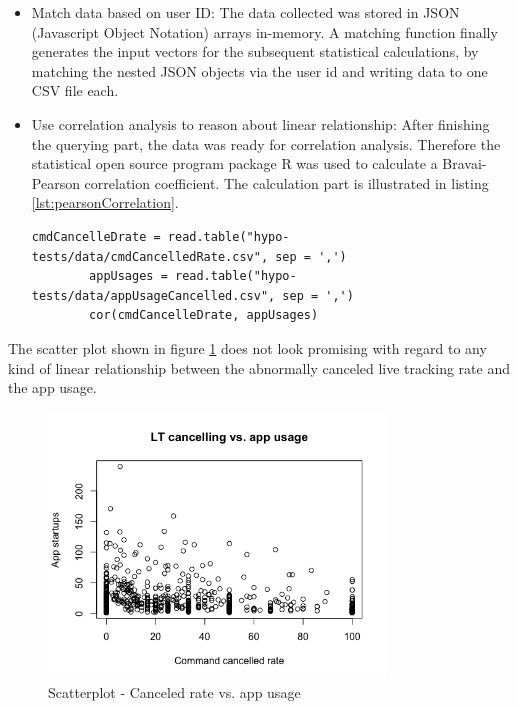 \begin{enumerate}
\begin{itemize}
		\item Match data based on user ID: The data collected was stored in JSON (Javascript Object Notation) arrays in-memory. A matching function finally generates the input vectors for the subsequent statistical calculations, by matching the nested JSON objects via the user id and writing data to one CSV file each. 
		\item Use correlation analysis to reason about linear relationship: After finishing the querying part, the data was ready for correlation analysis. Therefore the statistical open source program package R was used to calculate a Bravai-Pearson correlation coefficient. The calculation part is illustrated in listing \ref{lst:pearsonCorrelation}. 
		
		\begin{lstlisting}[caption={Calculation of pearson correlation and statistical test in R}, label={lst:pearsonCorrelation}]
		cmdCancelleDrate = read.table("hypo-tests/data/cmdCancelledRate.csv", sep = ',')
		appUsages = read.table("hypo-tests/data/appUsageCancelled.csv", sep = ',')
		cor(cmdCancelleDrate, appUsages)
		\end{lstlisting}
	\end{itemize}

	The scatter plot shown in figure \ref{fig:canceledvsAppUsage} does not look promising with regard to any kind of linear relationship between the abnormally canceled live tracking rate and the app usage. 
	
	\begin{figure}
		\centering
		\includegraphics[width=0.8\textwidth]{img/LT_cancelled_rate_vs_app_usage.png}
		\caption{Scatterplot - Canceled rate vs. app usage}
		\label{fig:canceledvsAppUsage}
	\end{figure} 
	

\end{enumerate}
